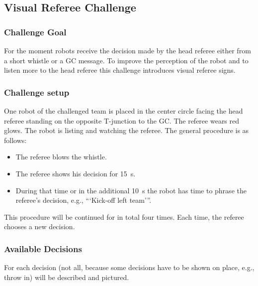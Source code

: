 \subsection{Visual Referee Challenge}
    
    \subsubsection{Challenge Goal}

        For the moment robots receive the decision made by the head referee either from a short whistle or a GC message. To improve the perception of the robot and to listen more to the head referee this challenge introduces visual referee signs.

    \subsubsection{Challenge setup}

        One robot of the challenged team is placed in the center circle facing the head referee standing on the opposite T-junction to the GC. The referee wears red glows. The robot is listing and watching the referee. The general procedure is as follows:

        \begin{itemize}
            \item The referee blows the whistle.
            \item The referee shows his decision for \qty{15}{\second}.
            \item During that time or in the additional \qty{10}{\second} the robot has time to phrase the referee's decision, e.g., ```Kick-off left team'''. 
        \end{itemize}

        This procedure will be continued for in total four times. Each time, the referee chooses a new decision.

    \subsubsection{Available Decisions}
        
        For each decision (not all, because some decisions have to be shown on place, e.g., throw in) will be described and pictured.

